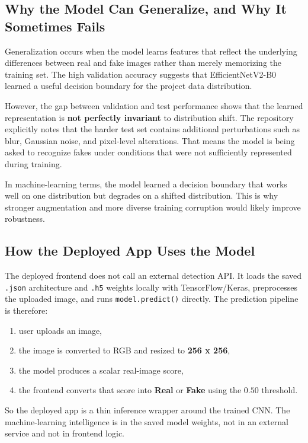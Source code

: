 \documentclass[11pt]{article}
\begin{document}
\subsection{Why the Model Can Generalize, and Why It Sometimes Fails}

Generalization occurs when the model learns features that reflect the underlying differences between real and fake images rather than merely memorizing the training set. The high validation accuracy suggests that EfficientNetV2-B0 learned a useful decision boundary for the project data distribution.

However, the gap between validation and test performance shows that the learned representation is \textbf{not perfectly invariant} to distribution shift. The repository explicitly notes that the harder test set contains additional perturbations such as blur, Gaussian noise, and pixel-level alterations. That means the model is being asked to recognize fakes under conditions that were not sufficiently represented during training.

In machine-learning terms, the model learned a decision boundary that works well on one distribution but degrades on a shifted distribution. This is why stronger augmentation and more diverse training corruption would likely improve robustness.

\subsection{How the Deployed App Uses the Model}

The deployed frontend does not call an external detection API. It loads the saved \texttt{.json} architecture and \texttt{.h5} weights locally with TensorFlow/Keras, preprocesses the uploaded image, and runs \texttt{model.predict()} directly. The prediction pipeline is therefore:
\begin{enumerate}[leftmargin=1.5em]
    \item user uploads an image,
    \item the image is converted to RGB and resized to \textbf{256 x 256},
    \item the model produces a scalar real-image score,
    \item the frontend converts that score into \textbf{Real} or \textbf{Fake} using the \(0.50\) threshold.
\end{enumerate}

So the deployed app is a thin inference wrapper around the trained CNN. The machine-learning intelligence is in the saved model weights, not in an external service and not in frontend logic.
\end{document}
